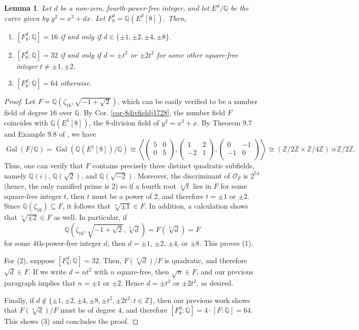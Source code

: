 \documentclass[11pt]{amsart}
\newtheorem{lemma}[defn]{Lemma}
\theoremstyle{definition}
\newcommand{\Q}{\mathbb Q}
\newcommand{\Z}{\mathbb Z}
\newcommand{\Gal}{\operatorname{Gal}}
\begin{document}
\begin{lemma}\label{lem-8divfielddegreej1728}
    Let $d$ be a non-zero, fourth-power-free integer, and let $E^d/\Q$ be the curve given by $y^2=x^3+dx$. Let $F^d_8 = \Q(E^d[8])$. Then,
    \begin{enumerate}
        \item $[F^d_8:\Q]=16$ if and only if $d\in \{\pm 1, \pm 2, \pm 4, \pm 8 \}.$
        \item $[F^d_8:\Q]=32$ if and only if $d = \pm t^2$ or $\pm 2t^2$ for some other square-free integer $t\neq \pm 1, \pm 2$.
        \item $[F^d_8:\Q]=64$ otherwise.
    \end{enumerate}
\end{lemma}
\begin{proof}
    Let $F=\Q\left(\zeta_{16}, \sqrt{-1+\sqrt{2}}\right)$, which can be easily verified to be a number field of degree $16$ over $\Q$. By Cor. \ref{cor-8divfieldj1728}, the number field $F$ coincides with $\Q(E^1[8])$, the $8$-division field of $y^2=x^3+x$. By Theorem 9.7 and Example 9.8 of \cite{lozano-galoiscm}, we have
    $$\Gal(F/\Q)=\Gal(\Q(E^1[8])/\Q)\cong \left\langle \left(\begin{array}{cc} 5 & 0 \\ 0 & 5\\\end{array}\right), \left(\begin{array}{cc} 1 & 2 \\ -2 & 1\\\end{array}\right), \left(\begin{array}{cc} 0 & -1 \\ -1 & 0\\\end{array}\right) \right\rangle \cong (\Z/2\Z \times \Z/4\Z)\rtimes \Z/2\Z.$$
    Thus, one can verify that $F$ contains precisely three distinct quadratic subfields, namely $\Q(i)$, $\Q(\sqrt{2})$, and $\Q(\sqrt{-2})$. Moreover, the discriminant of $\mathcal{O}_F$ is $2^{54}$ (hence, the only ramified prime is $2$) so if a fourth root $\sqrt[4]{t}$ lies in $F$ for some square-free integer $t$, then $t$ must be a power of $2$, and therefore $t=\pm 1$ or $\pm 2$. Since $\Q(\zeta_{16})\subseteq F$, it follows that $\sqrt[4]{\pm 1}\in F$. In addition, a calculation shows that $\sqrt[4]{\pm 2}\in F$ as well. In particular, if
    $$\Q\left(\zeta_{16}, \sqrt{-1+\sqrt{2}},\sqrt[4]{d}\right) = F(\sqrt[4]{d})=F$$
    for some $4$th-power-free integer $d$, then $d=\pm 1$, $\pm 2$, $\pm 4$, or $\pm 8$. This proves (1).

    For (2), suppose $[F_8^d:\Q]=32$. Then, $F(\sqrt[4]{d})/F$ is quadratic, and therefore $\sqrt{d}\in F$. If we write $d=nt^2$ with $n$ square-free, then $\sqrt{n}\in F$, and our previous paragraph implies that $n=\pm 1$ or $\pm 2$. Hence $d=\pm t^2$ or $\pm 2t^2$, as desired.

    Finally, if $d\not\in \{\pm 1,\pm 2,\pm 4,\pm 8, \pm t^2,\pm 2t^2 : t \in \Z\}$, then our previous work shows that $F(\sqrt[4]{d})/F$ must be of degree $4$, and therefore $[F_8^d:\Q]=4\cdot [F:\Q]=64$. This shows (3) and concludes the proof.
\end{proof}
\end{document}
